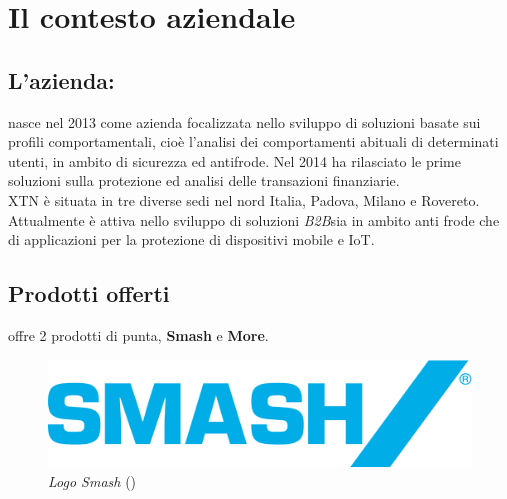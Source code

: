 
\chapter{Il contesto aziendale}
\label{cap:processi-metodologie}

\section{L'azienda: \textbf{\azienda}}
\textbf{\azienda} nasce nel 2013 come azienda focalizzata nello sviluppo di soluzioni basate sui profili comportamentali, cioè l'analisi dei comportamenti abituali di determinati utenti, in ambito di sicurezza ed antifrode. Nel 2014 ha rilasciato le prime soluzioni sulla protezione ed analisi delle transazioni finanziarie.\\
XTN è situata in tre diverse sedi nel nord Italia, Padova, Milano e Rovereto. Attualmente è attiva  nello sviluppo di soluzioni \emph{B2B}\glsfirstoccur sia in ambito anti frode che di applicazioni per la protezione di dispositivi mobile e IoT.\\
  
\section{Prodotti offerti}

\textit{\azienda} offre 2 prodotti di punta, \textbf{Smash\textregistered} e \textbf{More\textregistered}.\\
\begin{figure}[h!]
	\centering
	\includegraphics[scale=0.1]{immagini/smash.png}
	\caption{\textit{Logo Smash\textregistered} ()}
\end{figure}
\\

